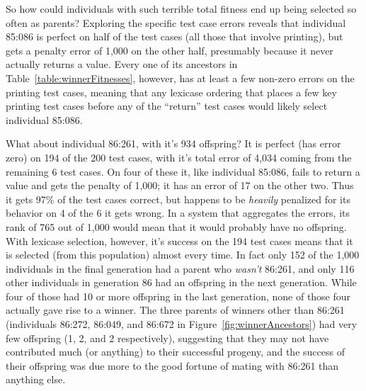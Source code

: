 So how could individuals with such terrible total fitness end up being selected so often as parents?
Exploring the specific test case errors reveals that individual 85:086 is perfect on half of the test
cases (all those that involve printing), but gets a penalty error of 1,000 on the other half, presumably
because it never actually returns a value. Every one of its ancestors in 
Table~\ref{table:winnerFitnesses}, however, has at least a few non-zero errors on the printing
test cases, meaning that any lexicase ordering that places a few key printing test cases before
any of the ``return'' test cases would likely select individual 85:086.

What about individual 86:261, with it's 934 offspring? It is perfect (has error zero) on 194 of the 200
test cases, with it's total error of 4,034 coming from the remaining 6 test cases. On four of these it,
like individual 85:086, fails to return a value and gets the penalty of 1,000; it has an error of 17 on
the other two. Thus it gets 97\% of the test cases correct, but happens to be \emph{heavily} penalized
for its behavior on 4 of the 6 it gets wrong. In a system that aggregates the errors, its rank of 765
out of 1,000 would mean that it would probably have no offspring. With lexicase selection, however,
it's success on the 194 test cases means that it is selected (from this population) almost every time.
In fact only 152 of the 1,000 individuals in the final generation had a parent who \emph{wasn't}
86:261, and only 116 other individuals in generation 86 had an offspring in the next generation. While
four of those had 10 or more offspring in the last generation, none of those four actually
gave rise to a winner. The three parents of winners other than 86:261 (individuals 86:272, 86:049, 
and 86:672 in Figure~\ref{fig:winnerAncestors}) had very few offspring (1, 2, and 2 respectively),
suggesting that they may not have contributed much (or anything) to their successful progeny, and 
the success of their offspring was due more to the good fortune of mating with 86:261 than anything else.

